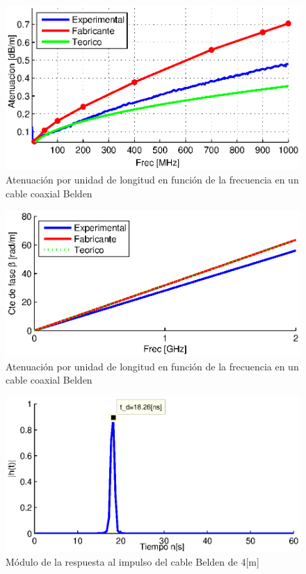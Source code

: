 \documentclass[10pt,conference,a4paper]{IEEEtran}
\begin{document}
\begin{figure}[htb]
    \centering
    \includegraphics[width=\columnwidth]{figuras/atenuacion_comparada.eps}
    \caption{Atenuación por unidad de longitud en función de la frecuencia en un cable coaxial Belden}
    \label{fig:atenuacion_comparada_coaxial}
\end{figure}
\begin{figure}[htb]
    \centering
    \includegraphics[width=\columnwidth]{figuras/constante_fase.eps}
    \caption{Atenuación por unidad de longitud en función de la frecuencia en un cable coaxial Belden}
    \label{fig:constante_fase}
\end{figure}
\begin{figure}[htb]
    \centering
    \includegraphics[width=\columnwidth]{figuras/respuesta_impulso.eps}
    \caption{Módulo de la respuesta al impulso del cable Belden de 4[m]}
    \label{fig:respuesta_impulso_coaxial}
\end{figure}
\end{document}
